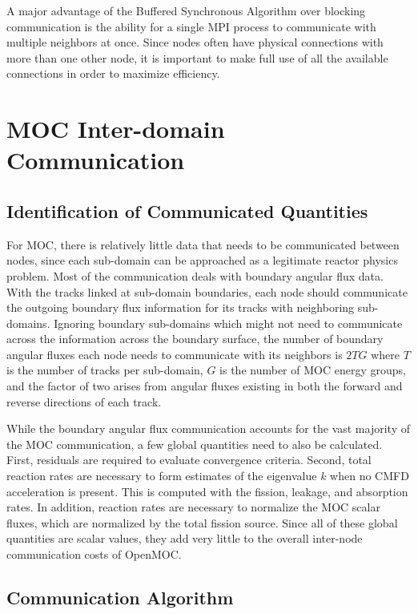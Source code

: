 A major advantage of the Buffered Synchronous Algorithm over blocking communication is the ability for a single \ac{MPI} process to communicate with multiple neighbors at once. Since nodes often have physical connections with more than one other node, it is important to make full use of all the available connections in order to maximize efficiency.


\section{MOC Inter-domain Communication}
\label{sec:moc-dd}

\subsection{Identification of Communicated Quantities}

For \ac{MOC}, there is relatively little data that needs to be communicated between nodes, since each sub-domain can be approached as a legitimate reactor physics problem. Most of the communication deals with boundary angular flux data. With the tracks linked at sub-domain boundaries, each node should communicate the outgoing boundary flux information for its tracks with neighboring sub-domains. Ignoring boundary sub-domains which might not need to communicate across the information across the boundary surface, the number of boundary angular fluxes each node needs to communicate with its neighbors is $2TG$ where $T$ is the number of tracks per sub-domain, $G$ is the number of \ac{MOC} energy groups, and the factor of two arises from angular fluxes existing in both the forward and reverse directions of each track.

While the boundary angular flux communication accounts for the vast majority of the \ac{MOC} communication, a few global quantities need to also be calculated. First, residuals are required to evaluate convergence criteria. Second, total reaction rates are necessary to form estimates of the eigenvalue $k$ when no  \ac{CMFD} acceleration is present. This is computed with the fission, leakage, and absorption rates. In addition, reaction rates are necessary to normalize the \ac{MOC} scalar fluxes, which are normalized by the total fission source. Since all of these global quantities are scalar values, they add very little to the overall inter-node communication costs of OpenMOC.

\subsection{Communication Algorithm}

